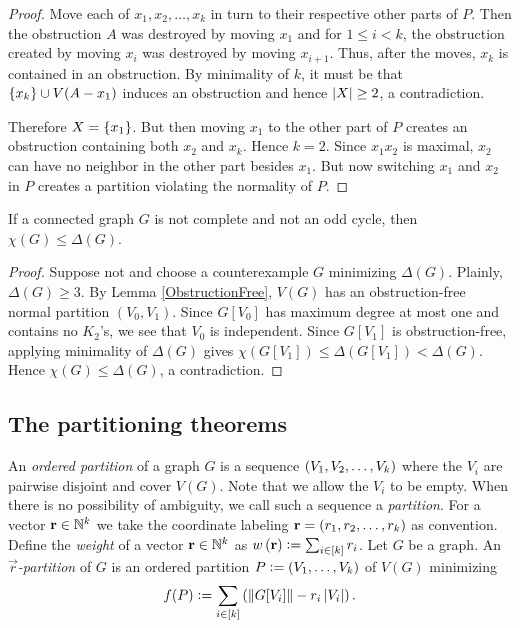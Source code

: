 \begin{proof}
Move each of $x_1, x_2, \ldots, x_k$ in turn to their respective other parts of $P$.  Then the obstruction $A$ was destroyed by moving $x_1$ and for $1 \leq i < k$, the obstruction created by moving $x_i$ was destroyed by moving $x_{i+1}$.  Thus, after the moves, $x_k$ is contained in an obstruction.  By minimality of $k$, it must be that $\left\{ x_k \right\} \cup V(A - x_1)$ induces an obstruction and hence $\left|X\right| \geq 2$, a contradiction. 

Therefore $X = \left\{ x_1 \right\}$.  But then moving $x_1$ to the other part of $P$ creates an obstruction containing both $x_2$ and $x_k$.  Hence $k = 2$.
Since $x_1x_2$ is maximal, $x_2$ can have no neighbor in the other part besides
$x_1$.  But now switching $x_1$ and $x_2$ in $P$ creates a partition violating
the normality of $P$.
\end{proof}

\begin{thm}[Brooks 1941]
If a connected graph $G$ is not complete and not an odd cycle, then
$\chi(G) \leq \Delta(G)$.
\end{thm}
\begin{proof}
Suppose not and choose a counterexample $G$ minimizing $\Delta(G)$. 
Plainly, $\Delta(G) \geq 3$.  By Lemma \ref{ObstructionFree}, $V(G)$ has an
obstruction-free normal partition $(V_0, V_1)$.  
Since $G[V_0]$ has maximum degree at most one and contains no
$K_2$'s, we see that $V_0$ is independent.  Since $G[V_1]$ is obstruction-free,
applying minimality of $\Delta(G)$ gives $\chi(G[V_1]) \leq \Delta(G[V_1]) <
\Delta(G)$.  Hence $\chi(G) \leq \Delta(G)$, a contradiction.
\end{proof}

\subsection{The partitioning theorems}
An \emph{ordered partition} of a graph $G$ is a sequence $\left( V_1, V_2,	\ldots, V_k \right)$ where the $V_i$ are pairwise disjoint and cover $V(G)$.  
Note that we allow the $V_i$ to be
empty.  When there is no possibility of ambiguity, we call such a sequence a
\emph{partition}.	For a vector $\mathbf{r} \in \mathbb{N}^k$ we take the
coordinate labeling $\mathbf{r} = \left( r_1, r_2, \ldots, r_k \right)$ as convention. 
Define the \emph{weight} of a vector $\mathbf{r} \in \mathbb{N}^k$ as $w\left( \mathbf{r} \right) \mathrel{\mathop:}= \sum_{i \in \left[k\right]} r_i$.   
Let $G$ be a graph. An \emph{$\vec{r}$-partition} of $G$ is an ordered partition
$P \mathrel{\mathop:}= \left( V_1, \ldots, V_k \right)$ of $V(G)$ minimizing \[f(P) \mathrel{\mathop:}= \sum_{i \in \left[k\right]} \left( \left\Vert G[V_i]\right\Vert - r_i\left|V_i\right| \right).\]

